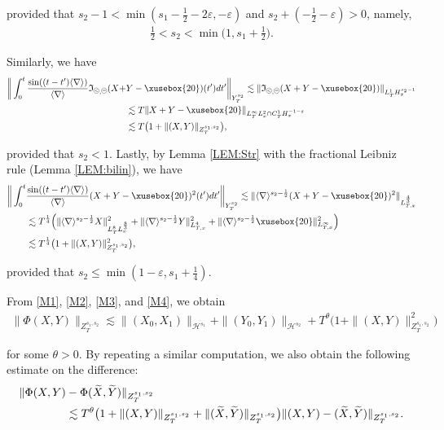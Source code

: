 \documentclass[%
11pt,  reqno]{amsart}
\def\<#1>{\xusebox{#1}}
\newcommand{\pe}{\mathbin{\scaleobj{0.7}{\tikz \draw (0,0) node[shape=circle,draw,inner sep=0pt,minimum size=8.5pt] {\scriptsize  $=$};}}}
\newcommand{\pl}{\mathbin{\scaleobj{0.7}{\tikz \draw (0,0) node[shape=circle,draw,inner sep=0pt,minimum size=8.5pt] {\scriptsize $<$};}}}
\newcommand{\1}{\hspace{0.2mm}\text{I}\hspace{0.2mm}}
\newcommand{\noi}{\noindent}
\newcommand{\nb}{\nabla}
\newcommand{\eps}{\varepsilon}
\newcommand{\wt}{\widetilde}
\newcommand{\ta}{\theta}
\newcommand{\les}{\lesssim}
\newcommand{\jb}[1]
{\langle #1 \rangle}
\renewcommand{\H}{\mathcal{H}}
\newcommand{\If}{\mathfrak{I}}
\numberwithin{equation}{section}
\numberwithin{theorem}{section}
\begin{document}
\noi
provided that
$s_2 - 1 < \min(s_1 - \frac 12-2\eps, -\eps)$ and $s_2 + (-\frac 12-\eps) > 0$,
namely, 
\begin{align*}
\tfrac 12 < s_2 < \min\big(1, s_1 +\tfrac 12\big).
\end{align*}


\noi
Similarly, we have
\begin{align}
\bigg\|  \int_0^t   \frac{\sin((t-t')\jb{\nb})}{\jb{\nb}}    \If_{\pl, \pe}(X + & Y - \<20>)(t') dt'
 \bigg\|_{Y^{s_2}_T}
   \les  \|\If_{\pl, \pe}(X + Y - \<20>)\|_{L^1_T H^{s_2 -1 }_x}\notag\\
 &  \les T  \|X + Y - \<20>\|_{L^\infty_T L^2_x\cap C^1_TH^{-1-\eps}_x}\notag\\
& \les  T \big( 1 + \|(X, Y)\|_{Z^{s_1, s_2}_T} \big), 
\label{M3} 
\end{align}

\noi
provided that $s_2 < 1$.
Lastly, by Lemma \ref{LEM:Str}
with the fractional Leibniz rule (Lemma \ref{LEM:bilin}), we have
\begin{align}
\bigg\| \int_0^t &  \frac{\sin((t-t')\jb{\nb})}{\jb{\nb}} 
 (X+Y-\<20>)^2(t') dt'\bigg\|_{Y^{s_2}_T}
 \les \| \jb{\nb}^{s_2 - \frac 12}(X+Y-\<20>)^2\|_{L^\frac{4}{3}_{T, x}}\notag\\
& \les T^\frac{1}{4} 
\Big(\| \jb{\nb}^{s_2 - \frac 12}X\|_{L^8_T L^\frac{8}{3}_x}^2
+ \| \jb{\nb}^{s_2 - \frac 12}Y\|_{L^4_{T, x}}^2
+ \| \jb{\nb}^{s_2 - \frac 12}\<20>\|_{L^\infty_{T, x}}^2\Big)\notag\\
& \les T^\frac{1}{4} \big( 1 + \|(X, Y)\|_{Z^{s_1, s_2}_T}^2 \big), 
\label{M4}
\end{align}

\noi
provided that $s_2 \leq \min(1 -\eps, s_1 + \frac 14)$.

From \eqref{M1}, \eqref{M2}, \eqref{M3}, and \eqref{M4}, we obtain 
\begin{align}
\| \Phi(X, Y) \|_{Z^{s_1, s_2}_T}
\les 
\| (X_0, X_1) \|_{\H^{s_1}}
+ 
\| (Y_0, Y_1) \|_{\H^{s_2}}
+ 
T^\ta \big( 1 + \|(X, Y)\|_{Z^{s_1, s_2}_T}^2\big)
\label{M5}
\end{align}


\noi
for some $\ta > 0$.
By repeating a similar computation, 
we also obtain the following estimate on the difference: 
\begin{align}
\| \Phi(X, Y) & - \Phi(\wt X, \wt Y)\|_{Z^{s_1, s_2}_T}\notag\\
& \les 
T^\ta \big( 1 + \|(X, Y)\|_{Z^{s_1, s_2}_T} + \|(\wt X, \wt Y)\|_{Z^{s_1, s_2}_T} \big) 
 \|(X, Y) - (\wt X, \wt Y) \|_{Z^{s_1, s_2}_T}.
\label{M6}
\end{align}
\end{document}
